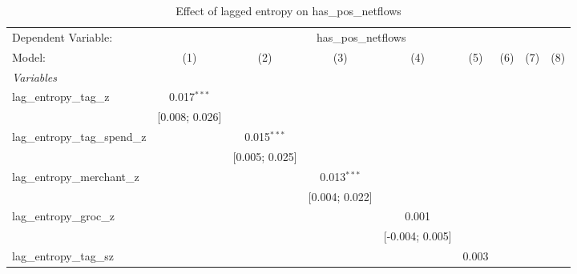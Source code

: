 
\begin{table}[htbp]
   \centering
   \tiny
   \begin{threeparttable}[b]
      \caption{\label{tab:reg_has_pos_netflows_lagged} Effect of lagged entropy on has\_pos\_netflows}
      \begin{tabular}{lcccccccc}
         \tabularnewline \midrule \midrule
         Dependent Variable: & \multicolumn{8}{c}{has\_pos\_netflows}\\
         Model:                           & (1)              & (2)              & (3)              & (4)              & (5)              & (6)              & (7)              & (8)\\  
         \midrule
         \emph{Variables}\\
         lag\_entropy\_tag\_z             & 0.017$^{***}$    &                  &                  &                  &                  &                  &                  &   \\   
                                          & [0.008; 0.026]   &                  &                  &                  &                  &                  &                  &   \\   
         lag\_entropy\_tag\_spend\_z      &                  & 0.015$^{***}$    &                  &                  &                  &                  &                  &   \\   
                                          &                  & [0.005; 0.025]   &                  &                  &                  &                  &                  &   \\   
         lag\_entropy\_merchant\_z        &                  &                  & 0.013$^{***}$    &                  &                  &                  &                  &   \\   
                                          &                  &                  & [0.004; 0.022]   &                  &                  &                  &                  &   \\   
         lag\_entropy\_groc\_z            &                  &                  &                  & 0.001            &                  &                  &                  &   \\   
                                          &                  &                  &                  & [-0.004; 0.005]  &                  &                  &                  &   \\   
         lag\_entropy\_tag\_sz            &                  &                  &                  &                  & 0.003            &                  &                  &   \\   

\end{tabular}
\end{threeparttable}
\end{table}

